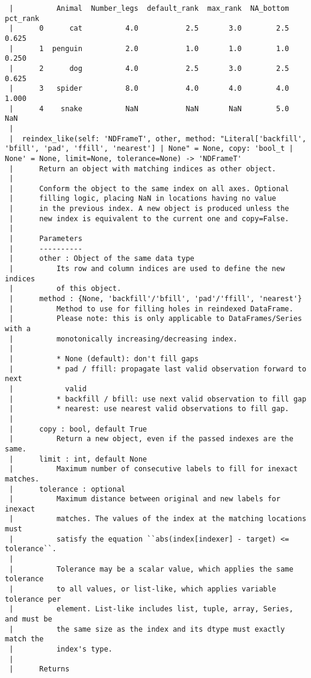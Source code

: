 \documentclass[
  letterpaper,
  DIV=11,
  numbers=noendperiod]{scrreprt}
\begin{document}
\begin{verbatim}
 |          Animal  Number_legs  default_rank  max_rank  NA_bottom  pct_rank
 |      0      cat          4.0           2.5       3.0        2.5     0.625
 |      1  penguin          2.0           1.0       1.0        1.0     0.250
 |      2      dog          4.0           2.5       3.0        2.5     0.625
 |      3   spider          8.0           4.0       4.0        4.0     1.000
 |      4    snake          NaN           NaN       NaN        5.0       NaN
 |  
 |  reindex_like(self: 'NDFrameT', other, method: "Literal['backfill', 'bfill', 'pad', 'ffill', 'nearest'] | None" = None, copy: 'bool_t | None' = None, limit=None, tolerance=None) -> 'NDFrameT'
 |      Return an object with matching indices as other object.
 |      
 |      Conform the object to the same index on all axes. Optional
 |      filling logic, placing NaN in locations having no value
 |      in the previous index. A new object is produced unless the
 |      new index is equivalent to the current one and copy=False.
 |      
 |      Parameters
 |      ----------
 |      other : Object of the same data type
 |          Its row and column indices are used to define the new indices
 |          of this object.
 |      method : {None, 'backfill'/'bfill', 'pad'/'ffill', 'nearest'}
 |          Method to use for filling holes in reindexed DataFrame.
 |          Please note: this is only applicable to DataFrames/Series with a
 |          monotonically increasing/decreasing index.
 |      
 |          * None (default): don't fill gaps
 |          * pad / ffill: propagate last valid observation forward to next
 |            valid
 |          * backfill / bfill: use next valid observation to fill gap
 |          * nearest: use nearest valid observations to fill gap.
 |      
 |      copy : bool, default True
 |          Return a new object, even if the passed indexes are the same.
 |      limit : int, default None
 |          Maximum number of consecutive labels to fill for inexact matches.
 |      tolerance : optional
 |          Maximum distance between original and new labels for inexact
 |          matches. The values of the index at the matching locations must
 |          satisfy the equation ``abs(index[indexer] - target) <= tolerance``.
 |      
 |          Tolerance may be a scalar value, which applies the same tolerance
 |          to all values, or list-like, which applies variable tolerance per
 |          element. List-like includes list, tuple, array, Series, and must be
 |          the same size as the index and its dtype must exactly match the
 |          index's type.
 |      
 |      Returns

\end{verbatim}
\end{document}
